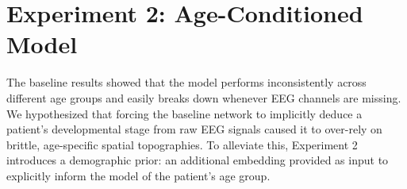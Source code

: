 \begin{table}[ht]
\centering
\caption{Performance breakdown by age group for the baseline models. Results are shown for the full 6 channels, 3 channels (robustness test / missing data), and natively trained 3 channels.}
\label{tab:age_group_results}
\end{table}

\FloatBarrier
\section{Experiment 2: Age-Conditioned Model}
\label{sec:exp2_data}
The baseline results showed that the model performs inconsistently across different age groups and easily breaks down whenever EEG channels are missing. We hypothesized that forcing the baseline network to implicitly deduce a patient’s developmental stage from raw EEG signals caused it to over-rely on brittle, age-specific spatial topographies. To alleviate this, Experiment 2 introduces a demographic prior: an additional embedding provided as input to explicitly inform the model of the patient's age group.

